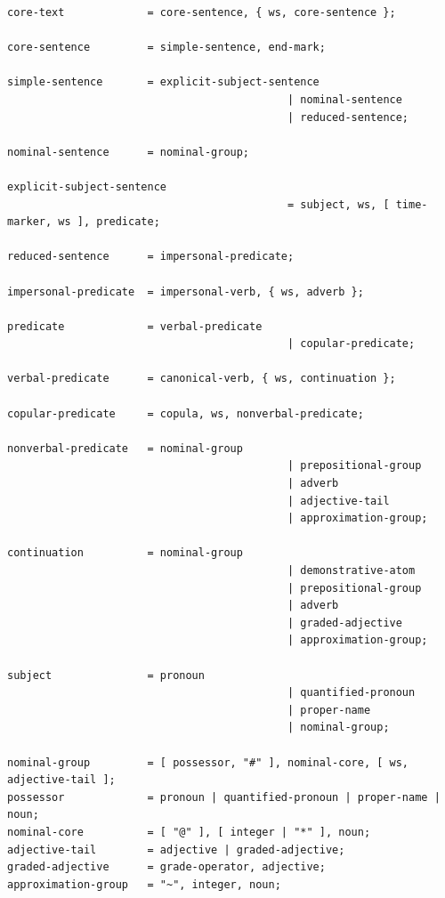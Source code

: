 \documentclass[12pt,onecolumn,letterpaper]{article}
\begin{document}
\small
\begin{verbatim}
core-text             = core-sentence, { ws, core-sentence };

core-sentence         = simple-sentence, end-mark;

simple-sentence       = explicit-subject-sentence
                                            | nominal-sentence
                                            | reduced-sentence;

nominal-sentence      = nominal-group;

explicit-subject-sentence
                                            = subject, ws, [ time-marker, ws ], predicate;

reduced-sentence      = impersonal-predicate;

impersonal-predicate  = impersonal-verb, { ws, adverb };

predicate             = verbal-predicate
                                            | copular-predicate;

verbal-predicate      = canonical-verb, { ws, continuation };

copular-predicate     = copula, ws, nonverbal-predicate;

nonverbal-predicate   = nominal-group
                                            | prepositional-group
                                            | adverb
                                            | adjective-tail
                                            | approximation-group;

continuation          = nominal-group
                                            | demonstrative-atom
                                            | prepositional-group
                                            | adverb
                                            | graded-adjective
                                            | approximation-group;

subject               = pronoun
                                            | quantified-pronoun
                                            | proper-name
                                            | nominal-group;

nominal-group         = [ possessor, "#" ], nominal-core, [ ws, adjective-tail ];
possessor             = pronoun | quantified-pronoun | proper-name | noun;
nominal-core          = [ "@" ], [ integer | "*" ], noun;
adjective-tail        = adjective | graded-adjective;
graded-adjective      = grade-operator, adjective;
approximation-group   = "~", integer, noun;


\end{verbatim}
\end{document}
